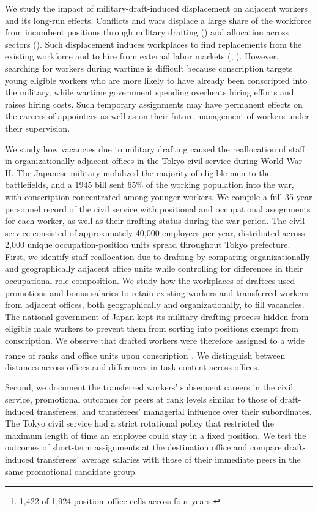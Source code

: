 We study the impact of military-draft-induced displacement on adjacent workers and its long-run effects.
Conflicts and wars displace a large share of the workforce from incumbent positions through military drafting (\cite{Acemoglu}) and allocation across sectors (\cite{Garin2025}). Such displacement induces workplaces to find replacements from the existing workforce and to hire from external labor markets (\cite{Acemoglu}, \cite{Goldin}).
However, searching for workers during wartime is difficult because conscription targets young eligible workers who are more likely to have already been conscripted into the military, while wartime government spending overheats hiring efforts and raises hiring costs.
Such temporary assignments may have permanent effects on the careers of appointees as well as on their future management of workers under their supervision.



We study how vacancies due to military drafting caused the reallocation of staff in organizationally adjacent offices in the Tokyo civil service during World War II.
The Japanese military mobilized the majority of eligible men to the battlefields, and a 1945 bill sent 65\% of the working population into the war, with conscription concentrated among younger workers.
We compile a full 35-year personnel record of the civil service with positional and occupational assignments for each worker, as well as their drafting status during the war period.
The civil service consisted of approximately 40,000 employees per year, distributed across 2,000 unique occupation-position units spread throughout Tokyo prefecture.
First, we identify staff reallocation due to drafting by comparing organizationally and geographically adjacent office units while controlling for differences in their occupational-role composition.
We study how the workplaces of draftees used promotions and bonus salaries to retain existing workers and transferred workers from adjacent offices, both geographically and organizationally, to fill vacancies.
The national government of Japan kept its military drafting process hidden from eligible male workers to prevent them from sorting into positions exempt from conscription.
We observe that drafted workers were therefore assigned to a wide range of ranks and office units upon conscription\footnote{1,422 of 1,924 position--office cells across four years.}.
We distinguish between distances across offices and differences in task content across offices.

Second, we document the transferred workers' subsequent careers in the civil service, promotional outcomes for peers at rank levels similar to those of draft-induced transferees, and transferees' managerial influence over their subordinates.
The Tokyo civil service had a strict rotational policy that restricted the maximum length of time an employee could stay in a fixed position.
We test the outcomes of short-term assignments at the destination office and compare draft-induced transferees' average salaries with those of their immediate peers in the same promotional candidate group.


